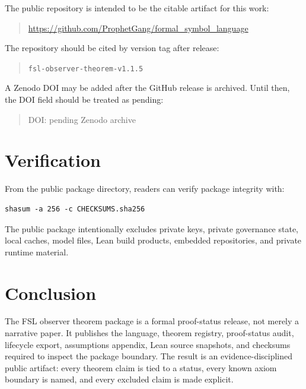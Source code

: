 \documentclass[11pt]{article}
\begin{document}
The public repository is intended to be the citable artifact for this work:

\begin{quote}
\url{https://github.com/ProphetGang/formal_symbol_language}
\end{quote}

The repository should be cited by version tag after release:

\begin{quote}
\texttt{fsl-observer-theorem-v1.1.5}
\end{quote}

A Zenodo DOI may be added after the GitHub release is archived. Until then, the DOI field should be treated as pending:

\begin{quote}
DOI: pending Zenodo archive
\end{quote}

\section{Verification}

From the public package directory, readers can verify package integrity with:

\begin{lstlisting}
shasum -a 256 -c CHECKSUMS.sha256
\end{lstlisting}

The public package intentionally excludes private keys, private governance state, local caches, model files, Lean build products, embedded repositories, and private runtime material.

\section{Conclusion}

The FSL observer theorem package is a formal proof-status release, not merely a narrative paper. It publishes the language, theorem registry, proof-status audit, lifecycle export, assumptions appendix, Lean source snapshots, and checksums required to inspect the package boundary. The result is an evidence-disciplined public artifact: every theorem claim is tied to a status, every known axiom boundary is named, and every excluded claim is made explicit.



\end{document}

